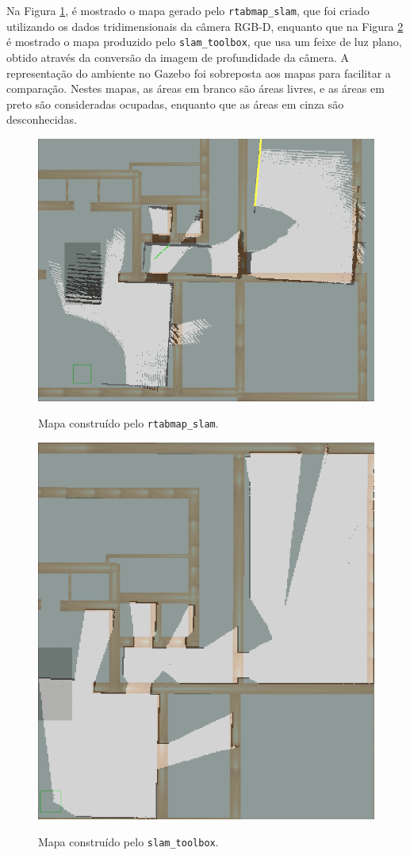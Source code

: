 \documentclass[repeatfields,xlists,xpacks,oneside,yearsonly]{ufrgscca}
\begin{document}
Na Figura \ref{fig:mapping_rtabmap}, é mostrado o mapa gerado pelo
\texttt{rtabmap\_slam}, que foi criado utilizando os dados
tridimensionais da câmera RGB-D, enquanto que na Figura
\ref{fig:mapping_slam_toolbox} é mostrado o mapa produzido pelo
\texttt{slam\_toolbox}, que usa um feixe de luz plano, obtido através
da conversão da imagem de profundidade da câmera. A representação do
ambiente no Gazebo foi sobreposta aos mapas para facilitar a
comparação. Nestes mapas, as áreas em branco são áreas livres, e as
áreas em preto são consideradas ocupadas, enquanto que as áreas em
cinza são desconhecidas.

\begin{figure}[H]
    {
        \centering
        \caption{Mapa construído pelo \texttt{rtabmap\_slam}.}
        \label{fig:mapping_rtabmap}
        \includegraphics[width=0.8\linewidth]{rtabmap_slam_map-compared.png}\\
    }
\end{figure}

\begin{figure}[H]
    {
        \centering
        \caption{Mapa construído pelo \texttt{slam\_toolbox}.}
        \label{fig:mapping_slam_toolbox}
        \includegraphics[width=0.6\linewidth]{slam_toolbox_map-compared.png}\\
    }
\end{figure}
\end{document}
